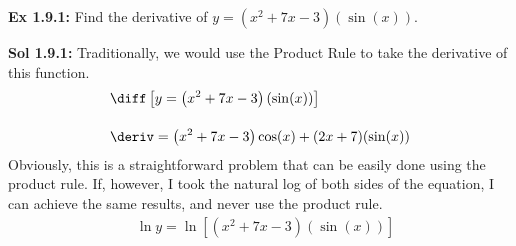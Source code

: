 \begin{tcolorbox}[example]
    \textbf{Ex 1.9.1: } Find the derivative of $y = \left(x^2 + 7x - 3\right)(\sin (x))$.
\end{tcolorbox}
\begin{tcolorbox}[solution]
    \textbf{Sol 1.9.1: } Traditionally, we would use the Product Rule to take the derivative of this function. \begin{align*}
        & \diff \left[y = \left(x^2 + 7x - 3\right)(\sin (x))\right] \\[11pt]
        & \deriv = \left(x^2 + 7x - 3\right)\cos (x) + (2x + 7)(\sin (x)) 
    \end{align*} 
    Obviously, this is a straightforward problem that can be easily done using the product rule. If, however, I took the natural log of both sides of the equation, I can achieve the same results, and never use the product rule. \begin{align*}
        & \ln y = \ln \left[\left(x^2 + 7x - 3\right)(\sin (x))\right] \\[11pt]
    \end{align*}
\end{tcolorbox}